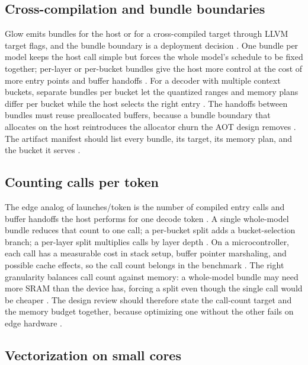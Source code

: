 \subsection{Cross-compilation and bundle boundaries}

Glow emits bundles for the host or for a cross-compiled target through LLVM target flags, and the bundle boundary is a deployment decision \citep{pytorchglow2024,rotem2018glow}. One bundle per model keeps the host call simple but forces the whole model's schedule to be fixed together; per-layer or per-bucket bundles give the host more control at the cost of more entry points and buffer handoffs \citep{patel2025llminference,memoryfloor2026}. For a decoder with multiple context buckets, separate bundles per bucket let the quantized ranges and memory plans differ per bucket while the host selects the right entry \citep{kwon2023vllm,taxbreak2026}. The handoffs between bundles must reuse preallocated buffers, because a bundle boundary that allocates on the host reintroduces the allocator churn the AOT design removes \citep{memoryfloor2026,patel2025llminference}. The artifact manifest should list every bundle, its target, its memory plan, and the bucket it serves \citep{chen2020compilerbasedhardw,rotem2018glow}.

\subsection{Counting calls per token}

The edge analog of launches/token is the number of compiled entry calls and buffer handoffs the host performs for one decode token \citep{taxbreak2026,patel2025llminference}. A single whole-model bundle reduces that count to one call; a per-bucket split adds a bucket-selection branch; a per-layer split multiplies calls by layer depth \citep{rotem2018glow,memoryfloor2026}. On a microcontroller, each call has a measurable cost in stack setup, buffer pointer marshaling, and possible cache effects, so the call count belongs in the benchmark \citep{dlbook,taxbreak2026}. The right granularity balances call count against memory: a whole-model bundle may need more SRAM than the device has, forcing a split even though the single call would be cheaper \citep{amd2024aie,memoryfloor2026}. The design review should therefore state the call-count target and the memory budget together, because optimizing one without the other fails on edge hardware \citep{patel2025llminference,rotem2018glow}.

\subsection{Vectorization on small cores}

